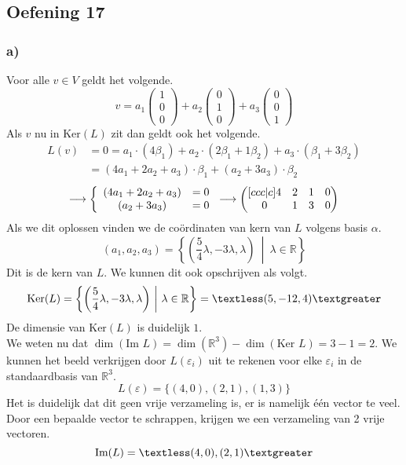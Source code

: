 \documentclass[lineaire_algebra_oplossingen.tex]{subfiles}
\begin{document}
\subsection{Oefening 17}
\subsubsection*{a)}
Voor alle $v \in V$ geldt het volgende.
\[
v
=
a_1
\begin{pmatrix}
1\\0\\0
\end{pmatrix}
+
a_2
\begin{pmatrix}
0\\1\\0
\end{pmatrix}
+
a_3
\begin{pmatrix}
0\\0\\1
\end{pmatrix}
\]
Als $v$ nu in $\text{Ker}(L)$ zit dan geldt ook het volgende.
\begin{align*}
L(v)
&= 0 = a_1 \cdot (4\beta_1) + a_2 \cdot (2 \beta_1 + 1\beta_2) + a_3 \cdot (\beta_1 + 3\beta_2) \\
&= (4a_1+2a_2+a_3)\cdot\beta_1 + (a_2+3a_3)\cdot\beta_2
\end{align*}
\[
\longrightarrow
\left\lbrace
\begin{array}{c c}
(4a_1+2a_2+a_3) &= 0\\
(a_2+3a_3) &= 0
\end{array}
\right.
\longrightarrow
\begin{pmatrix}[ccc|c]
4 & 2 & 1 & 0 \\
0 & 1 & 3 & 0
\end{pmatrix}
\]
Als we dit oplossen vinden we de co\"ordinaten van kern van $L$ volgens basis $\alpha$.
\[
(a_1,a_2,a_3) = 
\left\{ \left( \frac{5}{4}\lambda,-3\lambda,\lambda \right) \ \middle|\ \lambda \in \mathbb{R} \right\}
\]
Dit is de kern van $L$. We kunnen dit ook opschrijven als volgt.
\[
\text{Ker}(L)
= \left\{ \left( \frac{5}{4}\lambda,-3\lambda,\lambda \right) \ \middle|\ \lambda \in \mathbb{R} \right\}
= \textless(5,-12,4)\textgreater
\]
De dimensie van $\text{Ker}(L)$ is duidelijk $1$.\\
We weten nu dat $\dim(\text{Im } L) = \dim(\mathbb{R}^3) - \dim(\text{Ker }L) = 3-1=2$. We kunnen het beeld verkrijgen door $L(\varepsilon_i)$ uit te rekenen voor elke $\varepsilon_i$ in de standaardbasis van $\mathbb{R}^3$.
\[
L(\varepsilon) = \{ (4,0),(2,1),(1,3) \}
\]
Het is duidelijk dat dit geen vrije verzameling is, er is namelijk \'e\'en vector te veel. Door een bepaalde vector te schrappen, krijgen we een verzameling van 2 vrije vectoren.
\[
\text{Im}(L) = \textless(4,0),(2,1)\textgreater
\]
\end{document}
